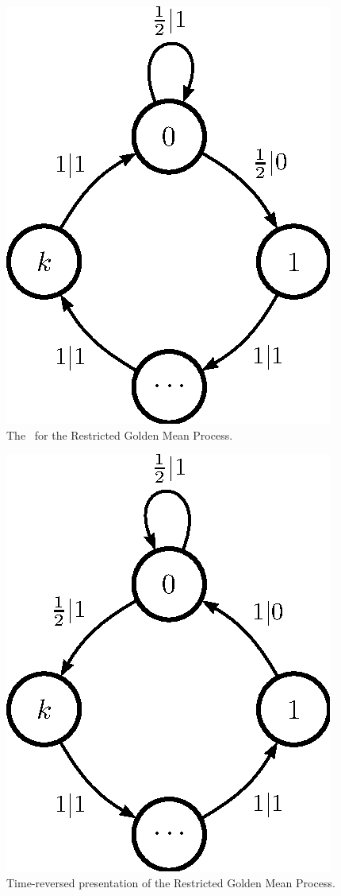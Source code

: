 \documentclass[prl,twocolumn,showpacs,superscriptaddress,preprintnumbers,floatfix]{revtex4}
\theoremstyle{plain}   \newtheorem{Lem}{Lemma}
\theoremstyle{plain} 	\newtheorem{Cor}{Corollary}
\theoremstyle{plain} 	\newtheorem{The}{Theorem}
\theoremstyle{plain} 	\newtheorem{Prop}{Proposition}
\theoremstyle{plain} 	\newtheorem*{Conj}{Conjecture}
\theoremstyle{plain}	\newtheorem*{Rem}{Remark}
\theoremstyle{plain}	\newtheorem*{Def}{Definition}
\theoremstyle{plain}	\newtheorem*{Not}{Notation}
\begin{document}
\begin{figure}[th]
\begin{center}
\includegraphics{restrictedgm_feM_ur.eps}
\caption{The \eM\ for the Restricted Golden Mean Process.}
\label{fig:RestrictedGM}
\end{center}
\end{figure}

\begin{figure}[th]
\begin{center}
\includegraphics{restrictedgm_TRfeM_ur.eps}
\caption{Time-reversed presentation of the Restricted Golden Mean Process.}
\label{fig:TRRestrictedGM}
\end{center}
\end{figure}
\end{document}
